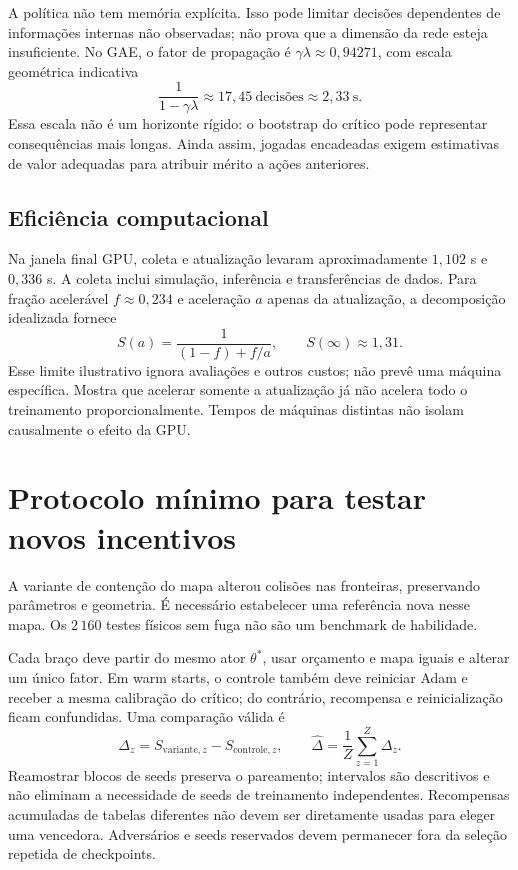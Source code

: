 \documentclass[11pt,a4paper]{article}
\begin{document}
A política não tem memória explícita. Isso pode limitar decisões dependentes de informações internas não observadas; não prova que a dimensão da rede esteja insuficiente. No GAE, o fator de propagação é $\gamma\lambda\approx0{,}94271$, com escala geométrica indicativa
\begin{equation}
 \frac{1}{1-\gamma\lambda}\approx17{,}45\ \text{decisões}\approx2{,}33\ \mathrm{s}.
\end{equation}
Essa escala não é um horizonte rígido: o bootstrap do crítico pode representar consequências mais longas. Ainda assim, jogadas encadeadas exigem estimativas de valor adequadas para atribuir mérito a ações anteriores.

\subsection{Eficiência computacional}
Na janela final GPU, coleta e atualização levaram aproximadamente $1{,}102$ s e $0{,}336$ s. A coleta inclui simulação, inferência e transferências de dados. Para fração acelerável $f\approx0{,}234$ e aceleração $a$ apenas da atualização, a decomposição idealizada fornece
\begin{equation}
 S(a)=\frac{1}{(1-f)+f/a},\qquad S(\infty)\approx1{,}31.
\end{equation}
Esse limite ilustrativo ignora avaliações e outros custos; não prevê uma máquina específica. Mostra que acelerar somente a atualização já não acelera todo o treinamento proporcionalmente. Tempos de máquinas distintas não isolam causalmente o efeito da GPU.

\section{Protocolo mínimo para testar novos incentivos}
A variante de contenção do mapa alterou colisões nas fronteiras, preservando parâmetros e geometria. É necessário estabelecer uma referência nova nesse mapa. Os $2\,160$ testes físicos sem fuga não são um benchmark de habilidade.

Cada braço deve partir do mesmo ator $\theta^*$, usar orçamento e mapa iguais e alterar um único fator. Em warm starts, o controle também deve reiniciar Adam e receber a mesma calibração do crítico; do contrário, recompensa e reinicialização ficam confundidas. Uma comparação válida é
\begin{equation}
 \Delta_z=S_{\mathrm{variante},z}-S_{\mathrm{controle},z},\qquad
 \widehat\Delta=\frac{1}{Z}\sum_{z=1}^{Z}\Delta_z.
\end{equation}
Reamostrar blocos de seeds preserva o pareamento; intervalos são descritivos e não eliminam a necessidade de seeds de treinamento independentes. Recompensas acumuladas de tabelas diferentes não devem ser diretamente usadas para eleger uma vencedora. Adversários e seeds reservados devem permanecer fora da seleção repetida de checkpoints.
\end{document}
